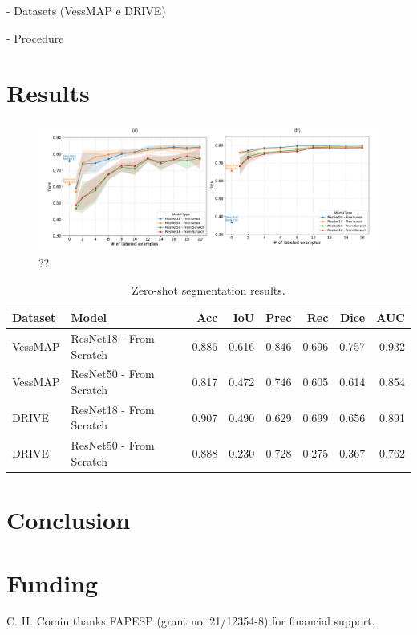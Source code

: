 \documentclass[%
reprint,
nofootinbib,
 amsmath,amssymb,
aps,
superscriptaddress,
showkeys,
longbibliography
]{revtex4-1}
\begin{document}
- Datasets (VessMAP e DRIVE)

- Procedure

\section{Results}
\label{s:results}

\begin{figure}[tbp]
    \centering
    \includegraphics[width=\textwidth]{figures/results/results_charts.pdf}
    \caption{??.}
    \label{f:results_charts}
\end{figure}


\begin{table}[t]
\caption{Zero-shot segmentation results.}
\label{tab:zero_shot_results}
\centering
\begingroup
\small
\setlength{\tabcolsep}{3pt}
\renewcommand{\arraystretch}{1.15}
\begin{tabularx}{\textwidth}{l X r r r r r r}
\hline
	\textbf{Dataset} & \textbf{Model} & \textbf{Acc} & \textbf{IoU} & \textbf{Prec} & \textbf{Rec} & \textbf{Dice} & \textbf{AUC} \\
\hline
VessMAP & ResNet18 - From Scratch & 0.886 & 0.616 & 0.846 & 0.696 & 0.757 & 0.932 \\
VessMAP & ResNet50 - From Scratch & 0.817 & 0.472 & 0.746 & 0.605 & 0.614 & 0.854 \\
\hline
DRIVE & ResNet18 - From Scratch & 0.907 & 0.490 & 0.629 & 0.699 & 0.656 & 0.891 \\
DRIVE & ResNet50 - From Scratch & 0.888 & 0.230 & 0.728 & 0.275 & 0.367 & 0.762 \\
\hline
\end{tabularx}
\endgroup
\end{table}


\section{Conclusion}
\label{s:conclusion}




\section*{Funding}
C. H. Comin thanks FAPESP (grant no. 21/12354-8) for financial support. 



\end{document}
